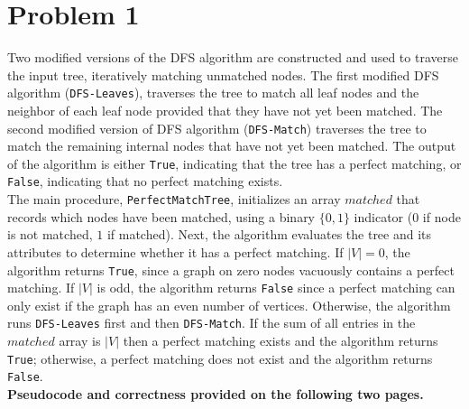 \documentclass[twoside,11pt]{homework}
\date{\today}
\begin{document}
\maketitle

\section*{Problem 1}
Two modified versions of the DFS algorithm are constructed and used to traverse the input tree,  iteratively matching unmatched nodes.  The first modified DFS algorithm (\texttt{DFS-Leaves}),  traverses the tree to match all leaf nodes and the neighbor of each leaf node provided that they have not yet been matched.  The second modified version of DFS algorithm (\texttt{DFS-Match}) traverses the tree to match the remaining internal nodes that have not yet been matched.  The output of the algorithm is either \texttt{True}, indicating that the tree has a perfect matching, or \texttt{False},  indicating that no perfect matching exists.  \\

\noindent
The main procedure, \texttt{PerfectMatchTree}, initializes an array $matched$ that records which nodes have been matched, using a binary $\{0,1\}$ indicator ($0$ if node is not matched, $1$ if matched).  Next, the algorithm evaluates the tree and its attributes to determine whether it has a perfect matching.  If $|V| = 0$, the algorithm returns \texttt{True}, since a graph on zero nodes vacuously contains a perfect matching.  If $|V|$ is odd, the algorithm returns \texttt{False} since a perfect matching can only exist if the graph has an even number of vertices.  Otherwise, the algorithm runs \texttt{DFS-Leaves} first and then \texttt{DFS-Match}.  If the sum of all entries in the $matched$ array is $|V|$ then a perfect matching exists and the algorithm returns \texttt{True}; otherwise, a perfect matching does not exist and the algorithm returns \texttt{False}.   \\

\noindent
\textbf{Pseudocode and correctness provided on the following two pages. }\\ 

\end{document}
